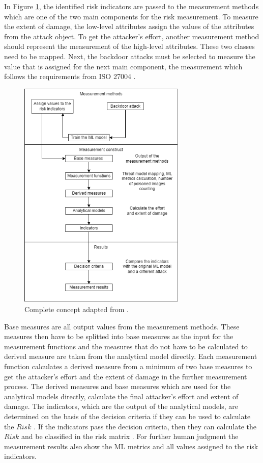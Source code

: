 In Figure \ref{fig:complete_architecture}, the identified risk indicators are passed to the measurement methods which are one of the two main components for the risk measurement. To measure the extent of damage, the low-level attributes assign the values of the attributes from the attack object. To get the attacker's effort, another measurement method should represent the measurement of the high-level attributes. These two classes need to be mapped. Next, the backdoor attacks must be selected to measure the value that is assigned for the next main component, the measurement which follows the requirements from ISO 27004 \cite{ISO_27004_2009}.

\begin{figure}[ht!]
  \centering
  \includegraphics[width=8cm]{pictures/complete_architecture.png}
  \caption{Complete concept adapted from \cite{ISO_27004_2009}.}
  \label{fig:complete_architecture}
\end{figure}

Base measures are all output values from the measurement methods. These measures then have to be splitted into base measures as the input for the measurement functions and the measures that do not have to be calculated to derived measure are taken from the analytical model directly. Each measurement function calculates a derived measure from a minimum of two base measures to get the attacker's effort and the extent of damage in the further measurement process. The derived measures and base measures which are used for the analytical models directly, calculate the final attacker's effort and extent of damage. The indicators, which are the output of the analytical models, are determined on the basis of the decision criteria if they can be used to calculate the $Risk$ \cite{DBLP:journals/access/JianxingHSH21}. If the indicators pass the decision criteria, then they can calculate the $Risk$ and be classified in the risk matrix \cite{Ivanenko2020IMPLEMENTATIONOR}. For further human judgment the measurement results also show the ML metrics and all values assigned to the risk indicators.

